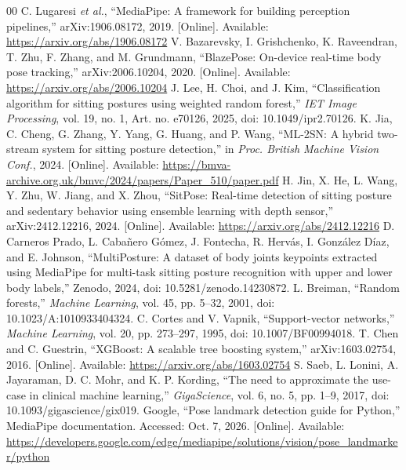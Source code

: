 \documentclass[conference]{IEEEtran}
\begin{document}
\begin{thebibliography}{00}
 C. Lugaresi \emph{et al.}, ``MediaPipe: A framework for building perception pipelines,'' arXiv:1906.08172, 2019. [Online]. Available: \url{https://arxiv.org/abs/1906.08172}
 V. Bazarevsky, I. Grishchenko, K. Raveendran, T. Zhu, F. Zhang, and M. Grundmann, ``BlazePose: On-device real-time body pose tracking,'' arXiv:2006.10204, 2020. [Online]. Available: \url{https://arxiv.org/abs/2006.10204}
 J. Lee, H. Choi, and J. Kim, ``Classification algorithm for sitting postures using weighted random forest,'' \emph{IET Image Processing}, vol. 19, no. 1, Art. no. e70126, 2025, doi: 10.1049/ipr2.70126.
 K. Jia, C. Cheng, G. Zhang, Y. Yang, G. Huang, and P. Wang, ``ML-2SN: A hybrid two-stream system for sitting posture detection,'' in \emph{Proc. British Machine Vision Conf.}, 2024. [Online]. Available: \url{https://bmva-archive.org.uk/bmvc/2024/papers/Paper_510/paper.pdf}
 H. Jin, X. He, L. Wang, Y. Zhu, W. Jiang, and X. Zhou, ``SitPose: Real-time detection of sitting posture and sedentary behavior using ensemble learning with depth sensor,'' arXiv:2412.12216, 2024. [Online]. Available: \url{https://arxiv.org/abs/2412.12216}
 D. Carneros Prado, L. Caba\~nero G\'omez, J. Fontecha, R. Herv\'as, I. Gonz\'alez D\'iaz, and E. Johnson, ``MultiPosture: A dataset of body joints keypoints extracted using MediaPipe for multi-task sitting posture recognition with upper and lower body labels,'' Zenodo, 2024, doi: 10.5281/zenodo.14230872.
 L. Breiman, ``Random forests,'' \emph{Machine Learning}, vol. 45, pp. 5--32, 2001, doi: 10.1023/A:1010933404324.
 C. Cortes and V. Vapnik, ``Support-vector networks,'' \emph{Machine Learning}, vol. 20, pp. 273--297, 1995, doi: 10.1007/BF00994018.
 T. Chen and C. Guestrin, ``XGBoost: A scalable tree boosting system,'' arXiv:1603.02754, 2016. [Online]. Available: \url{https://arxiv.org/abs/1603.02754}
 S. Saeb, L. Lonini, A. Jayaraman, D. C. Mohr, and K. P. Kording, ``The need to approximate the use-case in clinical machine learning,'' \emph{GigaScience}, vol. 6, no. 5, pp. 1--9, 2017, doi: 10.1093/gigascience/gix019.
 Google, ``Pose landmark detection guide for Python,'' MediaPipe documentation. Accessed: Oct. 7, 2026. [Online]. Available: \url{https://developers.google.com/edge/mediapipe/solutions/vision/pose_landmarker/python}
\end{thebibliography}
\end{document}
